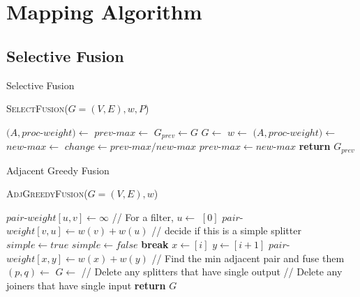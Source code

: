 \section{Mapping Algorithm}

\subsection{Selective Fusion}
\begin{algorithm}
\caption{Selective Fusion} \label {alg:select_fus}
\textsc{SelectFusion}($G = (V, E), w, P$)
\begin{algorithmic}[1]
\State $(A, proc$-$weight) \gets $  
\State $prev$-$max \gets $ 
\Repeat
	\State $G_{prev} \gets G$
	\State $G \gets $ 
	\State $w \gets $ 
	\State $(A, proc$-$weight) \gets $ 
	\State $new$-$max \gets $ 
	\State $change \gets prev$-$max / new$-$max $
	\State $prev$-$max \gets new$-$max$
\State \textbf{return} $G_{prev}$
\end{algorithmic}
\end{algorithm}



\begin{algorithm}
\caption{Adjacent Greedy Fusion} \label {alg:adj_fus}
\textsc{AdjGreedyFusion}($G = (V, E), w$)
\begin{algorithmic}[1]
		\State $pair$-$weight[u,v] \gets \infty$
	\EndFor
\EndFor
{}
\Statex // For a filter, 
		\State $u \gets $ $[0]$
		\State $pair$-$weight[v,u] \gets w(v) + w(u)$
		\Statex // decide if this is a simple splitter
		\State $simple \gets true$			
				\State $simple \gets false$
				\State \textbf{break}
			\EndIf
		\EndFor
				\State $x \gets $$[i]$
				\State $y \gets $$[i + 1]$
				\State $pair$-$weight[x,y] \gets w(x) + w(y)$
			\EndFor 
		\EndIf
	\EndIf
\EndFor
\Statex // Find the min adjacent pair and fuse them
\State $(p, q) \gets $ 
\State $G \gets $ 
\Statex // Delete any splitters that have single output
\State {}
\Statex // Delete any joiners that have single input
\State {}
\State \textbf{return} $G$
\end{algorithmic}
\end{algorithm}

